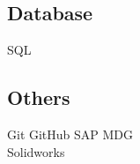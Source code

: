 \documentclass[]{deedy-resume-openfont}
\begin{document}
\begin{minipage}[t]{0.33\textwidth}
\vspace{8pt}
\subsection{Database}
\vspace{2pt}
SQL\\
\vspace{8pt}



\subsection{Others}
\vspace{2pt}
Git \textbullet{} GitHub \textbullet{} SAP MDG\\
Solidworks\\


%
%

\end{minipage} 
\hfill
\end{document}
